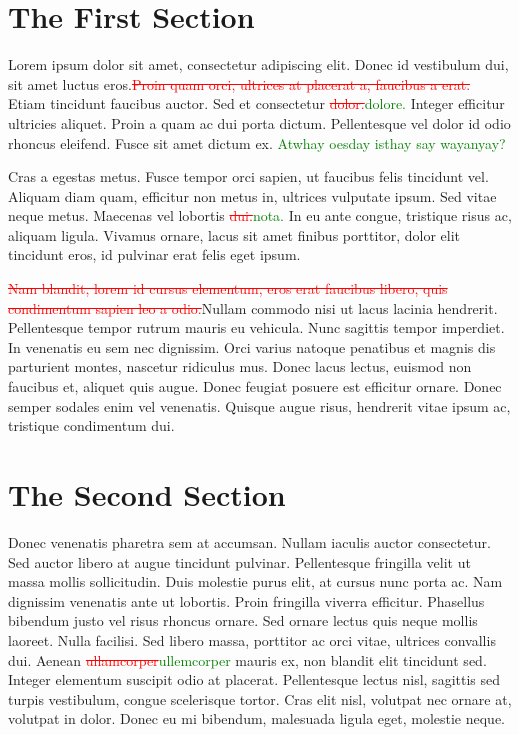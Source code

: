 \documentclass[12pt]{article}
\begin{document}
\section{The First Section}

Lorem ipsum dolor sit amet, consectetur adipiscing elit. Donec id vestibulum dui, sit amet luctus eros.\textcolor{red}{\st{Proin quam orci, ultrices at placerat a, faucibus a erat.}} Etiam tincidunt faucibus auctor. Sed et consectetur \textcolor{red}{\st{dolor.}}\textcolor{green}{dolore.} Integer efficitur ultricies aliquet. Proin a quam ac dui porta dictum. Pellentesque vel dolor id odio rhoncus eleifend. Fusce sit amet dictum ex. \textcolor{green}{Atwhay oesday isthay say wayanyay?}

Cras a egestas metus. Fusce tempor orci sapien, ut faucibus felis tincidunt vel. Aliquam diam quam, efficitur non metus in, ultrices vulputate ipsum. Sed vitae neque metus. Maecenas vel lobortis \textcolor{red}{\st{dui.}}\textcolor{green}{nota.} In eu ante congue, tristique risus ac, aliquam ligula. Vivamus ornare, lacus sit amet finibus porttitor, dolor elit tincidunt eros, id pulvinar erat felis eget ipsum.

\textcolor{red}{\st{Nam blandit, lorem id cursus elementum, eros erat faucibus libero, quis condimentum sapien leo a odio.}}Nullam commodo nisi ut lacus lacinia hendrerit.  Pellentesque tempor rutrum mauris eu vehicula. Nunc sagittis tempor imperdiet.  In venenatis eu sem nec dignissim. Orci varius natoque penatibus et magnis dis parturient montes, nascetur ridiculus mus. Donec lacus lectus, euismod non faucibus et, aliquet quis augue. Donec feugiat posuere est efficitur ornare.  Donec semper sodales enim vel venenatis. Quisque augue risus, hendrerit vitae ipsum ac, tristique condimentum dui.

\section{The Second Section}

Donec venenatis pharetra sem at accumsan. Nullam iaculis auctor consectetur. Sed auctor libero at augue tincidunt pulvinar. Pellentesque fringilla velit ut massa mollis sollicitudin. Duis molestie purus elit, at cursus nunc porta ac. Nam dignissim venenatis ante ut lobortis. Proin fringilla viverra efficitur. Phasellus bibendum justo vel risus rhoncus ornare. Sed ornare lectus quis neque mollis laoreet. Nulla facilisi. Sed libero massa, porttitor ac orci vitae, ultrices convallis dui. Aenean \textcolor{red}{\st{ullamcorper}}\textcolor{green}{ullemcorper} mauris ex, non blandit elit tincidunt sed. Integer elementum suscipit odio at placerat. Pellentesque lectus nisl, sagittis sed turpis vestibulum, congue scelerisque tortor. Cras elit nisl, volutpat nec ornare at, volutpat in dolor. Donec eu mi bibendum, malesuada ligula eget, molestie neque.
\end{document}
